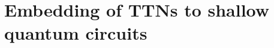 \documentclass[12pt,dvipdfmx,twoside,openright]{report}
\begin{document}
























\cleardoublepage
\chapter{Embedding of TTNs to shallow quantum circuits}
\end{document}
